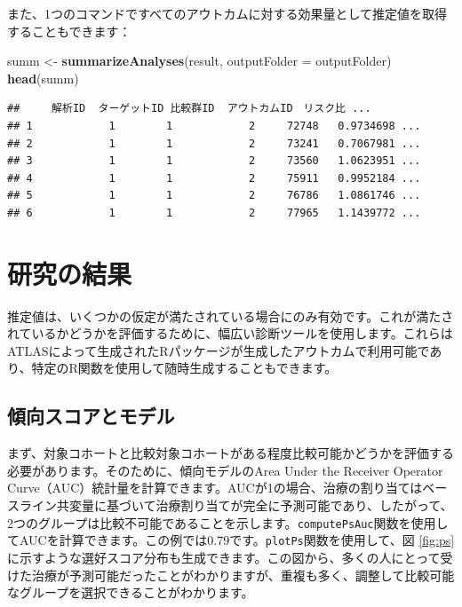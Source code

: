 \documentclass[
  11pt]{book}
\newenvironment{Shaded}{\begin{snugshade}}{\end{snugshade}}
\newcommand{\AttributeTok}[1]{\textcolor[rgb]{0.13,0.29,0.53}{#1}}
\newcommand{\FunctionTok}[1]{\textcolor[rgb]{0.13,0.29,0.53}{\textbf{#1}}}
\newcommand{\NormalTok}[1]{#1}
\newcommand{\OtherTok}[1]{\textcolor[rgb]{0.56,0.35,0.01}{#1}}
\theoremstyle{definition}
\theoremstyle{definition}
\theoremstyle{definition}
\theoremstyle{definition}
\theoremstyle{remark}
\begin{document}
また、1つのコマンドですべてのアウトカムに対する効果量として推定値を取得することもできます：

\begin{Shaded}
\begin{Highlighting}[]
\NormalTok{summ }\OtherTok{\textless{}{-}} \FunctionTok{summarizeAnalyses}\NormalTok{(result, }\AttributeTok{outputFolder =}\NormalTok{ outputFolder)}
\FunctionTok{head}\NormalTok{(summ)}
\end{Highlighting}
\end{Shaded}

\begin{verbatim}
##     解析ID  ターゲットID 比較群ID  アウトカムID　リスク比 ...
## 1            1        1            2     72748   0.9734698 ...
## 2            1        1            2     73241   0.7067981 ...
## 3            1        1            2     73560   1.0623951 ...
## 4            1        1            2     75911   0.9952184 ...
## 5            1        1            2     76786   1.0861746 ...
## 6            1        1            2     77965   1.1439772 ...
\end{verbatim}

\section{研究の結果}\label{studyOutputs}

推定値は、いくつかの仮定が満たされている場合にのみ有効です。これが満たされているかどうかを評価するために、幅広い診断ツールを使用します。これらはATLASによって生成されたRパッケージが生成したアウトカムで利用可能であり、特定のR関数を使用して随時生成することもできます。

\subsection{傾向スコアとモデル}\label{ux50beux5411ux30b9ux30b3ux30a2ux3068ux30e2ux30c7ux30eb}

まず、対象コホートと比較対象コホートがある程度比較可能かどうかを評価する必要があります。そのために、傾向モデルのArea Under the Receiver Operator Curve（AUC）統計量を計算できます。AUCが1の場合、治療の割り当てはベースライン共変量に基づいて治療割り当てが完全に予測可能であり、したがって、2つのグループは比較不可能であることを示します。\texttt{computePsAuc}関数を使用してAUCを計算できます。この例では0.79です。\texttt{plotPs}関数を使用して、図 \ref{fig:ps}に示すような選好スコア分布も生成できます。この図から、多くの人にとって受けた治療が予測可能だったことがわかりますが、重複も多く、調整して比較可能なグループを選択できることがわかります。 
\end{document}
